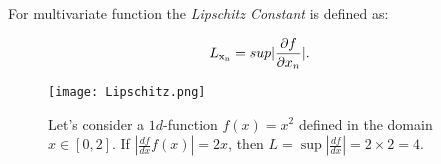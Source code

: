 For multivariate function the \textit{Lipschitz Constant} is defined as:

\begin{equation}
L\textsubscript{x\textsubscript{n}} = sup|\dfrac{\partial f}{\partial x_n}|.
\end{equation}

\begin{figure} [h!]
	\centering
	\texttt{[image: Lipschitz.png]}
	\caption{Let's consider a $1d$-function $f(x) = x^2$ defined in the domain $x \in [0, 2]$. If $|\frac{df}{dx} f(x) | = 2x$, then $L = \sup |\frac{df}{dx}| = 2 \times 2 = 4$.}
	\label{fig:Lipschitz}
\end{figure}

